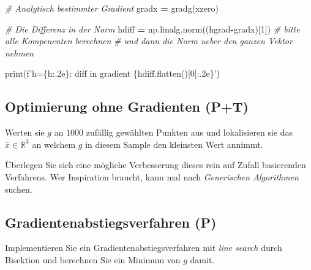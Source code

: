 \documentclass[]{book}
\newenvironment{Shaded}{\begin{snugshade}}{\end{snugshade}}
\newcommand{\BuiltInTok}[1]{#1}
\newcommand{\CommentTok}[1]{\textcolor[rgb]{0.56,0.35,0.01}{\textit{#1}}}
\newcommand{\DecValTok}[1]{\textcolor[rgb]{0.00,0.00,0.81}{#1}}
\newcommand{\NormalTok}[1]{#1}
\newcommand{\OperatorTok}[1]{\textcolor[rgb]{0.81,0.36,0.00}{\textbf{#1}}}
\newcommand{\SpecialCharTok}[1]{\textcolor[rgb]{0.00,0.00,0.00}{#1}}
\newcommand{\SpecialStringTok}[1]{\textcolor[rgb]{0.31,0.60,0.02}{#1}}
\theoremstyle{definition}
\theoremstyle{definition}
\theoremstyle{definition}
\theoremstyle{definition}
\theoremstyle{remark}
\begin{document}
\begin{Shaded}
\begin{Highlighting}[]
\CommentTok{# Analytisch bestimmter Gradient}
\NormalTok{gradx }\OperatorTok{=}\NormalTok{ gradg(xzero)}

\CommentTok{# Die Differenz in der Norm}
\NormalTok{hdiff }\OperatorTok{=}\NormalTok{ np.linalg.norm((hgrad}\OperatorTok{-}\NormalTok{gradx)[}\DecValTok{1}\NormalTok{])}
\CommentTok{# bitte alle Kompenenten berechnen}
\CommentTok{# und dann die Norm ueber den ganzen Vektor nehmen}

\BuiltInTok{print}\NormalTok{(}\SpecialStringTok{f'h=}\SpecialCharTok{\{h:.2e\}}\SpecialStringTok{: diff in gradient }\SpecialCharTok{\{}\NormalTok{hdiff}\SpecialCharTok{.}\NormalTok{flatten()[}\DecValTok{0}\NormalTok{]}\SpecialCharTok{:.2e\}}\SpecialStringTok{'}\NormalTok{)}
\end{Highlighting}
\end{Shaded}

\hypertarget{optimierung-ohne-gradienten-pt}{%
\subsection{Optimierung ohne Gradienten (P+T)}\label{optimierung-ohne-gradienten-pt}}

Werten sie \(g\) an \(1000\) zufällig gewählten Punkten aus und lokalisieren sie das \(\bar x \in \mathbb R^{3}\) an welchem \(g\) in diesem Sample den kleinsten Wert annimmt.

Überlegen Sie sich eine mögliche Verbesserung dieses rein auf Zufall basierenden Verfahrens. Wer Inspiration braucht, kann mal nach \emph{Generischen Algorithmen} suchen.

\hypertarget{gradientenabstiegsverfahren-p}{%
\subsection{Gradientenabstiegsverfahren (P)}\label{gradientenabstiegsverfahren-p}}

Implementieren Sie ein Gradientenabstiegsverfahren mit \emph{line search} durch Bisektion und berechnen Sie ein Minimum von \(g\) damit.
\end{document}
